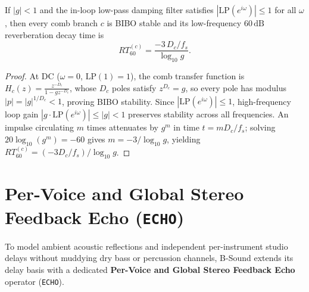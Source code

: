 \begin{theorem}
\label{thm:reverb-rt60}
If $|g| < 1$ and the in-loop low-pass damping filter satisfies $|\mathrm{LP}(e^{i\omega})| \le 1$ for all $\omega$, then every comb branch $c$ is BIBO stable and its low-frequency $60\,\text{dB}$ reverberation decay time is
\begin{equation}
RT_{60}^{(c)} = \frac{-3\,D_c / f_s}{\log_{10} g}.
\end{equation}
\end{theorem}

\begin{proof}
At DC ($\omega = 0$, $\mathrm{LP}(1) = 1$), the comb transfer function is $H_c(z) = \frac{z^{-D_c}}{1 - g z^{-D_c}}$, whose $D_c$ poles satisfy $z^{D_c} = g$, so every pole has modulus $|p| = |g|^{1/D_c} < 1$, proving BIBO stability. Since $|\mathrm{LP}(e^{i\omega})| \le 1$, high-frequency loop gain $|g\cdot \mathrm{LP}(e^{i\omega})| \le |g| < 1$ preserves stability across all frequencies. An impulse circulating $m$ times attenuates by $g^m$ in time $t = m D_c / f_s$; solving $20\log_{10}(g^m) = -60$ gives $m = -3 / \log_{10} g$, yielding $RT_{60}^{(c)} = (-3 D_c / f_s)/\log_{10} g$.
\end{proof}

\section{Per-Voice and Global Stereo Feedback Echo (\texttt{ECHO})}
\label{sec:echo-dsp}

To model ambient acoustic reflections and independent per-instrument studio delays without muddying dry bass or percussion channels, B-Sound extends its delay basis with a dedicated \textbf{Per-Voice and Global Stereo Feedback Echo} operator (\texttt{ECHO}).

